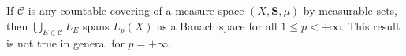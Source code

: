 If $\mathcal{C}$ is any countable covering of a measure space $(X, \mathbf{S}, \mu)$ by measurable sets, then $\bigcup_{E \in \mathcal{C}} L_E$ spans $L_p(X)$ as a Banach space for all $1 \leq p < +\infty$. This result is not true in general for $p = +\infty$.
